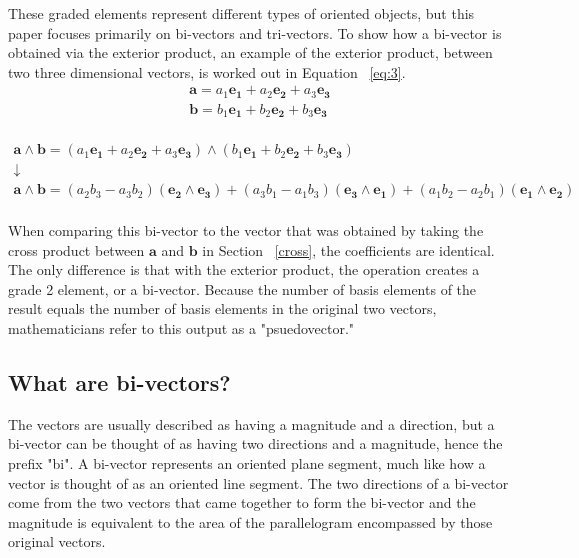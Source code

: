 \documentclass{amsart}
\begin{document}
		These graded elements represent different types of oriented objects, but this paper focuses primarily on bi-vectors and tri-vectors. To show how a bi-vector is obtained via the exterior product, an example of the exterior product, between two three dimensional vectors, is worked out in Equation ~\ref{eq:3}.\\

		\begin{gather*}
				\mathbf{a} = a_1 \mathbf{e_1} + a_2 \mathbf{e_2} + a_3 \mathbf{e_3}\\
				\mathbf{b} = b_1 \mathbf{e_1} + b_2 \mathbf{e_2} + b_3 \mathbf{e_3}\\
		\end{gather*}
	
		\begin{gather}
			\mathbf{a} \wedge \mathbf{b} = (a_1 \mathbf{e_1} + a_2 \mathbf{e_2} + a_3 \mathbf{e_3}) \wedge (b_1 \mathbf{e_1} + b_2 \mathbf{e_2} + b_3 \mathbf{e_3}) \\
			\downarrow \nonumber\\
			\mathbf{a} \wedge \mathbf{b} = (a_2 b_3 - a_3 b_2)(\mathbf{e_2} \wedge \mathbf{e_3}) + (a_3 b_1 - a_1 b_3)(\mathbf{e_3} \wedge \mathbf{e_1}) + (a_1 b_2 - a_2 b_1)(\mathbf{e_1} \wedge \mathbf{e_2}) \label{eq:3}\nonumber
		\end{gather}
		\\
		
		When comparing this bi-vector to the vector that was obtained by taking the cross product between $\mathbf{a}$ and $\mathbf{b}$ in Section ~\ref{cross}, the coefficients are identical. The only difference is that with the exterior product, the operation creates a grade 2 element, or a bi-vector. Because the number of basis elements of the result equals the number of basis elements in the original two vectors, mathematicians refer to this output as a "psuedovector."
		\subsection{What are bi-vectors?}\label{sub:3.1} 
			The vectors are usually described as having a magnitude and a direction, but a bi-vector can be thought of as having two directions and a magnitude, hence the prefix  "bi". A bi-vector represents an oriented plane segment, much like how a vector is thought of as an oriented line segment. The two directions of a bi-vector come from the two vectors that came together to form the bi-vector and the magnitude is equivalent to the area of the parallelogram encompassed by those original vectors.
			
\end{document}
